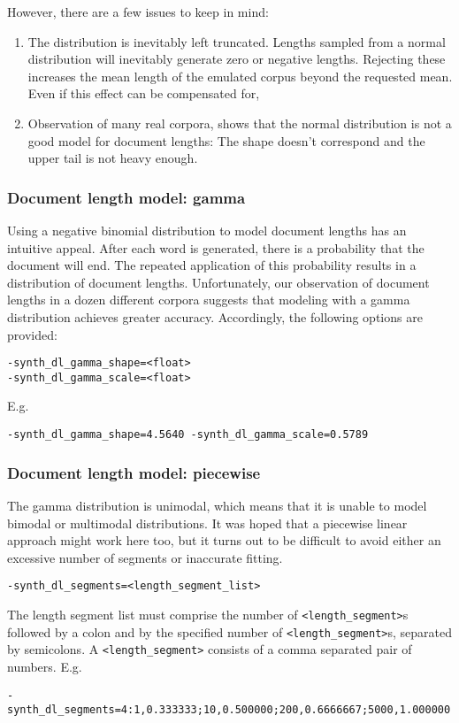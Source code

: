 \documentclass{article}
\begin{document}
However, there are a few issues to keep in mind:
\begin{enumerate}
  \item The distribution is inevitably left truncated. Lengths sampled
    from a normal distribution will inevitably generate zero or
    negative lengths. Rejecting these increases the mean length of the
    emulated corpus beyond the requested mean.   Even if this effect
    can be compensated for, 
    \item Observation of many real corpora, shows that the normal
      distribution is not a good model for document lengths: The shape
      doesn't correspond and the upper tail is not heavy enough.
\end{enumerate}

\subsubsection{Document length model: gamma}
Using a negative binomial distribution to model document lengths has
an intuitive appeal.  After each word is generated, there is a
probability that the document will end.  The repeated application of
this probability results in a distribution of document lengths.
Unfortunately, our observation of document lengths in a dozen
different corpora suggests that modeling with a gamma distribution
achieves greater accuracy.  Accordingly, the following options
are provided:

\begin{verbatim}
-synth_dl_gamma_shape=<float>
-synth_dl_gamma_scale=<float>
\end{verbatim}

E.g. 
\begin{verbatim}
-synth_dl_gamma_shape=4.5640 -synth_dl_gamma_scale=0.5789
\end{verbatim}


\subsubsection{Document length model: piecewise}
The gamma distribution is unimodal, which means that it is unable to
model bimodal or multimodal distributions.  It was hoped that a
piecewise linear approach might work here too, but it turns out to be
difficult to avoid either an excessive number of segments or
inaccurate fitting.  

\begin{verbatim}
-synth_dl_segments=<length_segment_list>
\end{verbatim}
The length segment list must comprise the number
of \verb|<length_segment>|s 
followed by a colon and by the specified number of
\verb|<length_segment>|s, separated by semicolons.
A \verb|<length_segment>| consists of a comma separated pair of
numbers. E.g.
\begin{verbatim}
-synth_dl_segments=4:1,0.333333;10,0.500000;200,0.6666667;5000,1.000000
\end{verbatim}
\end{document}
